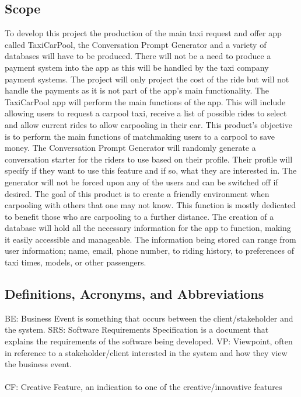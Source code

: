 \documentclass[]{article}
\begin{document}
\subsection{Scope}
\label{sub:scope}
To develop this project the production of the main taxi request and offer app called TaxiCarPool, the Conversation Prompt Generator and a variety of databases will have to be produced. There will not be a need to produce a payment system into the app as this will be handled by the taxi company payment systems. The project will only project the cost of the ride but will not handle the payments as it is not part of the app’s main functionality.
\newline \newline
The TaxiCarPool app will perform the main functions of the app. This will include allowing users to request a carpool taxi, receive a list of possible rides to select and allow current rides to allow carpooling in their car. This product’s objective is to perform the main functions of matchmaking users to a carpool to save money. 
\newline \newline
The Conversation Prompt Generator will randomly generate a conversation starter for the riders to use based on their profile. Their profile will specify if they want to use this feature and if so, what they are interested in. The generator will not be forced upon any of the users and can be switched off if desired. The goal of this product is to create a friendly environment when carpooling with others that one may not know. This function is mostly dedicated to benefit those who are carpooling to a further distance.
\newline \newline
The creation of a database will hold all the necessary information for the app to function, making it easily accessible and manageable. The information being stored can range from user information; name, email, phone number, to riding history, to preferences of taxi times, models, or other passengers. 

\subsection{Definitions, Acronyms, and Abbreviations}
\label{sub:definitions_acronyms_and_abbreviations}
BE: Business Event is something that occurs between the client/stakeholder and the system. 
\newline \newline
SRS: Software Requirements Specification is a document that explains the requirements of the software being developed.
\newline \newline
VP: Viewpoint, often in reference to a stakeholder/client interested in the system and how they view the business event. \\ \\
CF: Creative Feature, an indication to one of the creative/innovative features
\end{document}
